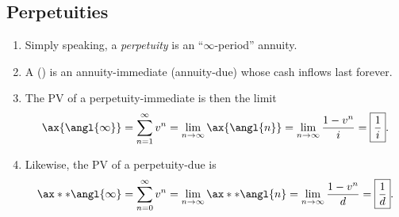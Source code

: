 \subsection{Perpetuities}
\label{subsect:perpetuity}
\begin{enumerate}
\item Simply speaking, a \emph{perpetuity} is an ``\(\infty\)-period'' annuity.
\item A  () is an
annuity-immediate (annuity-due) whose cash inflows last forever.
\item \label{it:pv-perpetuity-imm}
The PV of a perpetuity-immediate is then the limit
\[
\ax{\angl{\infty}}=\sum_{n=1}^{\infty}v^n=\lim_{n\to \infty}\ax{\angl{n}}
=\lim_{n\to \infty}\frac{1-v^n}{i}=\boxed{\frac{1}{i}}.
\]
\item \label{it:pv-perpetuity-due}
Likewise, the PV of a perpetuity-due is
\[
\ax**{\angl{\infty}}=\sum_{n=0}^{\infty}v^n=\lim_{n\to \infty}\ax**{\angl{n}}
=\lim_{n\to \infty}\frac{1-v^n}{d}=\boxed{\frac{1}{d}}.
\]
\end{enumerate}
